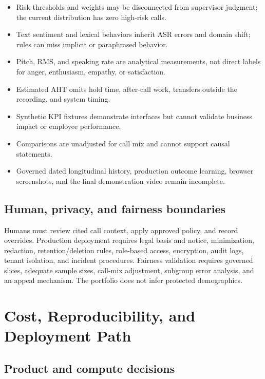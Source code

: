 \documentclass[11pt,letterpaper]{article}
\newenvironment{compactitem}{\begin{itemize}\setlength{\itemsep}{2pt}\setlength{\parskip}{0pt}\setlength{\topsep}{3pt}}{\end{itemize}}
\begin{document}
\begin{compactitem}
  \item Risk thresholds and weights may be disconnected from supervisor judgment; the
  current distribution has zero high-risk calls.
  \item Text sentiment and lexical behaviors inherit ASR errors and domain shift;
  rules can miss implicit or paraphrased behavior.
  \item Pitch, RMS, and speaking rate are analytical measurements, not direct labels
  for anger, enthusiasm, empathy, or satisfaction.
  \item Estimated AHT omits hold time, after-call work, transfers outside the recording,
  and system timing.
  \item Synthetic KPI fixtures demonstrate interfaces but cannot validate business
  impact or employee performance.
  \item Comparisons are unadjusted for call mix and cannot support causal statements.
  \item Governed dated longitudinal history, production outcome learning,
  browser screenshots, and the final demonstration video remain incomplete.
\end{compactitem}

\subsection{Human, privacy, and fairness boundaries}

Humans must review cited call context, apply approved policy, and record overrides.
Production deployment requires legal basis and notice, minimization, redaction,
retention/deletion rules, role-based access, encryption, audit logs, tenant isolation,
and incident procedures. Fairness validation requires governed slices, adequate sample
sizes, call-mix adjustment, subgroup error analysis, and an appeal mechanism. The
portfolio does not infer protected demographics.

\clearpage
\section{Cost, Reproducibility, and Deployment Path}

\subsection{Product and compute decisions}
\end{document}
